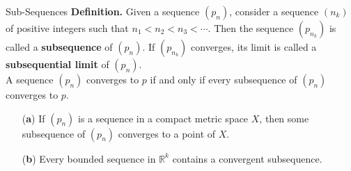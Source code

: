 \documentclass{beamer}
\begin{document}
\begin{frame}{Sub-Sequences}
\textbf{Definition.} Given a sequence $(p_n)$, consider a sequence $(n_k)$ of
positive integers such that $n_1 < n_2 < n_3 < \cdots$. Then the sequence
$(p_{n_k})$ is called a \textbf{subsequence} of $(p_n)$. If $(p_{n_k})$
converges, its limit is called a \textbf{subsequential limit} of $(p_n)$. \\ 

A sequence $(p_n)$ converges to $p$ if and only if every subsequence of $(p_n)$ converges to $p$.

\begin{theorem}
\begin{enumerate}
    \item[(\textbf{a})] If $(p_n)$ is a sequence in a compact metric space $X$, then some subsequence of $(p_n)$ converges to a point of $X$.
    \item[(\textbf{b})] Every bounded sequence in $\mathbb{R}^k$ contains a convergent subsequence.
\end{enumerate}
\end{theorem}
\end{frame}
\end{document}
